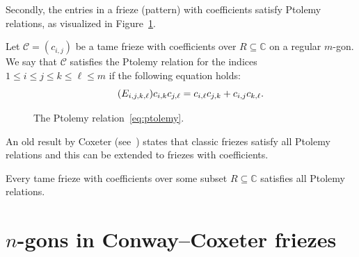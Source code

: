 \documentclass[ALCO,ThmDefs,Unicode,epreuves,published]{cedram}
\numberwithin{equation}{section}
\begin{document}
Secondly, 
the entries in a frieze (pattern) with coefficients satisfy Ptolemy relations,
as visualized in Figure~\ref{fig:Ptolemy}.

\begin{defi} \label{def:ptolemy}
Let $\mathcal{C}=(c_{i,j})$ be a tame frieze with coefficients over $R\subseteq \mathbb{C}$
on a regular $m$-gon. We say that $\mathcal{C}$ satisfies the Ptolemy relation for 
the indices $1\le i\le j\le k\le \ell\le m$ if the following equation holds:
\begin{equation*}\tag{$E_{i,j,k,\ell}$}\label{eq:ptolemy}
c_{i,k} c_{j,\ell} = c_{i,\ell} c_{j,k} + c_{i,j} c_{k,\ell}.
\end{equation*}
\end{defi}


\begin{figure}[htb]\centering
 \caption{The Ptolemy relation~\eqref{eq:ptolemy}. 
 \label{fig:Ptolemy}}
\end{figure}



An old result by Coxeter (see~\cite[Equation~(5.7)]{Cox71})
states that classic friezes satisfy all Ptolemy relations and this can be extended 
to friezes with coefficients. 



\begin{prop} \label{thm:ptolemy}
Every tame frieze with coefficients
over some subset $R\subseteq \mathbb{C}$
satisfies all Ptolemy relations.
\end{prop}


\section{\texorpdfstring{$n$}{n}-gons in Conway--Coxeter friezes}
\label{sec:ngons}
\end{document}
